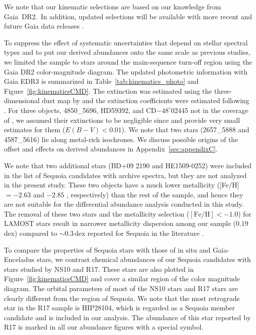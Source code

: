 \documentclass{aa}
\begin{document}
We note that our kinematic selections are based on our knowledge from Gaia~DR2.\ In addition, updated selections will be available with more recent and future Gaia data releases \citep[see][]{Loevdal2022a,RuizLara2022a}.

To suppress the effect of systematic uncertainties that depend on stellar spectral types and to put our derived abundances onto the same scale as previous studies, we limited the sample to stars around the main-sequence turn-off region using the Gaia DR2 color-magnitude diagram.
The updated photometric information with Gaia EDR3 is summarized in Table~\ref{tab:kinematics_photo} and Figure~\ref{fig:kinematicsCMD}.
The extinction was estimated using the three-dimensional dust map by \citet{Green2019a} and the extinction coefficients were estimated following \citet{Casagrande2021a}.
For three objects, 4850\_5696, HD59392, and CD$-48^{\circ}$02445 not in the coverage of \citet{Green2019a}, we assumed their extinctions to be negligible since \citet{RuizDern2018a} and \citet{Lallement2019a} provide very small estimates for them ($E(B-V)<0.01$). 
We note that two stars (2657\_5888 and 4587\_5616) lie along metal-rich isochrones.
We discuss possible origins of the offset and effects on derived abundances in Appendix~\ref{sec:appendixC}.

We note that two additional stars (BD+09 2190 and HE1509-0252) were included in the list of Sequoia candidates with archive spectra, but they are not analyzed in the present study.
These two objects have a much lower metallicity ([{Fe}/{H}]$=-2.63$ \citep{Ishigaki2012} and $-2.85$ \citep{Cohen2013a}, respectively) than the rest of the sample, and hence they are not suitable for the differential abundance analysis conducted in this study.
The removal of these two stars and the metallicity selection ($[\mathrm{Fe/H}]<-1.0$) for LAMOST stars result in narrower metallicity dispersion among our sample (0.19 dex) compared to $\sim 0.3\,\mathrm{dex}$ reported for Sequoia in the literature \citep[e.g.,][]{Matsuno2019a}.


To compare the properties of Sequoia stars with those of in situ and Gaia-Enceladus stars, we contrast chemical abundances of our Sequoia candidates with stars studied by NS10 and R17. 
These stars are also plotted in Figure~\ref{fig:kinematicsCMD} and cover a similar region of the color magnitude diagram. 
The orbital parameters of most of the NS10 stars and R17 stars are clearly different from the region of Sequoia.
We note that the most retrograde star in the R17 sample is HIP28104, which is regarded as a Sequoia member candidate and is included in our analysis.
The abundance of this star reported by R17 is marked in all our abundance figures with a special symbol.
\end{document}
